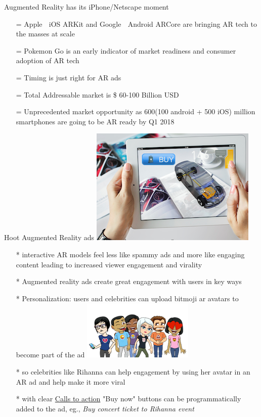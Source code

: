 \documentclass[10pt]{beamer}
\begin{document}
\begin{frame}[t]{Augmented Reality has its iPhone/Netscape moment}
  \begin{itemize}[<+-| alert@+>]
	\item[=]Apple 🍎
	 iOS ARKit and Google 🤖 Android ARCore are bringing AR tech to the masses at scale
	\item[=]Pokemon Go is an early indicator of market readiness and consumer adoption of AR tech
	\item[=]Timing is just right for AR ads
	\item[=]Total Addressable market is \$ 60-100 Billion USD 
	\item[=]Unprecedented market opportunity as 600(100 android + 500 iOS) million smartphones are going to be AR ready by Q1 2018
\end{itemize}
\end{frame}
\begin{frame}[t]{Hoot Augmented Reality ads \includegraphics[scale=.1]{static/arad/arad5}} 
  \begin{itemize}[<+-| alert@+>]
\item[*]interactive AR models feel  less like spammy ads and more like engaging content leading to increased viewer engagement and virality 
\item[*]Augmented reality ads create great engagement with users in key ways
\item[*]Personalization: users and celebrities can upload bitmoji ar avatars to become part of the ad
\includegraphics[scale=.15]{static/arad/bitmoji} 
\item[*]so celebrities like Rihanna can help engagement by using her avatar in an AR ad and help make it more viral 
\item[*]with clear \underline{Calls to action} "Buy now" buttons can be programmatically added to the ad, eg., \emph{ Buy concert ticket to Rihanna event}
\end{itemize}
\end{frame}
\end{document}
